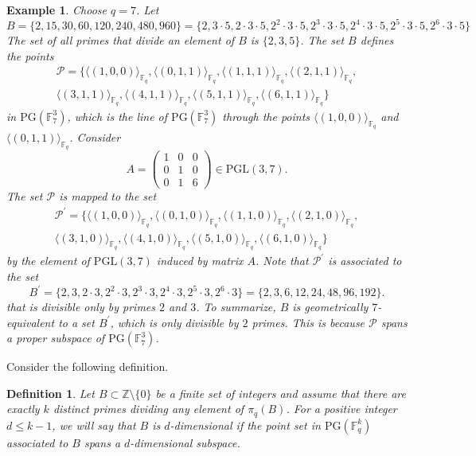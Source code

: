 \documentclass[12pt]{amsart}
\newtheorem{definition}{Definition}
\newtheorem{example}[theorem]{Example}
\newcommand{\F}{{\mathbb F}}
\newcommand{\fq}{{\mathbb F}_{q}}
\newcommand{\PG}{\mathrm{PG}}
\begin{document}
\begin{example}
    Choose $q=7$. Let \[B=\{2,15,30,60,120,240,480,960\}=\{2,3\cdot 5,2\cdot 3 \cdot 5,2^2\cdot 3 \cdot 5,2^3\cdot 3 \cdot 5,2^4\cdot 3 \cdot 5,2^5\cdot 3 \cdot 5, 2^6\cdot 3 \cdot 5\}\]
    The set of all primes that divide an element of $B$ is $\{2, 3, 5\}$.  The set $B$ defines the points 
\begin{multline*}
    \mathcal{P} = \Bigg\{\langle (1,0,0) \rangle_{\F_q},\langle (0,1,1) \rangle_{\F_q},\langle (1,1,1) \rangle_{\F_q},\langle (2,1,1) \rangle_{\F_q},\\ \langle (3,1,1) \rangle_{\F_q},\langle (4,1,1)  \rangle_{\F_q}, \langle (5,1,1) \rangle_{\F_q},\langle (6,1,1) \rangle_{\F_q} \Bigg\} 
\end{multline*}
    in $\PG(\F_{7}^{3})$, which is the line of $\PG(\F_{7}^{3})$ through the points $\langle (1,0,0) \rangle_{\F_q}$ and $\langle (0,1,1) \rangle_{\F_q}$. Consider
    \[
    A=\begin{pmatrix}
        1 & 0 & 0 \\
        0 & 1 & 0 \\
        0 & 1 & 6
    \end{pmatrix} \in \mathrm{PGL}(3,7).
    \] The set $\mathcal{P}$ is mapped to the set
    \begin{multline*}
    \mathcal{P}^{\prime} = \{ \langle (1,0,0)\rangle_{\fq},\langle(0,1,0)\rangle_{\fq},\langle(1,1,0)\rangle_{\fq},\langle(2,1,0)\rangle_{\fq}, \\\langle(3,1,0)\rangle_{\fq},\langle(4,1,0)\rangle_{\fq},\langle(5,1,0)\rangle_{\fq},\langle(6,1,0)\rangle_{\fq}\}\end{multline*} by the element of $\mathrm{PGL}(3,7)$ induced by matrix $A$. Note that $\mathcal{P}^{\prime}$ is associated to the set
    \[
   B^{\prime} = \{2, 3 ,2\cdot 3,2^2 \cdot 3,2^3 \cdot 3, 2^4 \cdot 3, 2^5\cdot 3,2^6 \cdot 3\}=\{2,3,6,12,24,48,96,192\}.
    \] that is divisible only by primes $2$ and $3$. To summarize, $B$ is geometrically $7$-equivalent to a set $B^{\prime}$, which is only divisible by $2$ primes. This is because $\mathcal{P}$ spans a proper subspace of $\PG(\F_{7}^{3})$. 
\end{example}
Consider the following definition. 
\begin{definition}
Let $B\subset\mathbb{Z}\setminus\{0\}$ be a finite set of integers and assume that there are exactly $k$ distinct primes dividing any element of $\pi_{q}(B)$. For a positive integer $d \leq k-1$, we will say that $B$ is $d$-dimensional if the point set in $\PG(\F_{q}^{k})$ associated to $B$ spans a $d$-dimensional subspace.
\end{definition}
\end{document}
